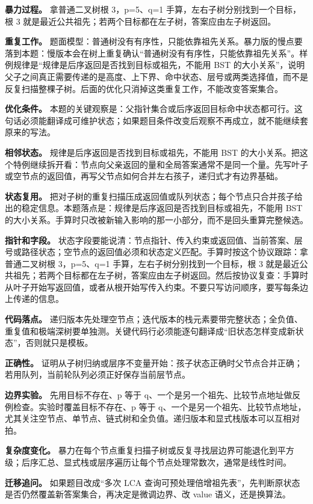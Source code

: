\textbf{暴力过程。} 拿普通二叉树根 3，p=5、q=1 手算，左右子树分别找到一个目标，根 3 就是最近公共祖先；若两个目标都在左子树，答案应由左子树返回。

\textbf{重复工作。} 题面模型：普通树没有有序性，只能依靠祖先关系。暴力版的慢点要落到本题：慢版本会在树上重复确认“普通树没有有序性，只能依靠祖先关系”。样例规律是“规律是后序返回是否找到目标或祖先，不能用 BST 的大小关系”，说明父子之间真正需要传递的是高度、上下界、命中状态、层号或两类选择值，而不是反复扫描整棵子树。后面的优化只消掉这类重复工作，不能改变答案集合。

\textbf{优化条件。} 本题的关键观察是：父指针集合或后序返回目标命中状态都可行。这句话必须能翻译成可维护状态；如果题目条件改变后观察不再成立，就不能继续套原来的写法。

\textbf{相邻状态。} 规律是后序返回是否找到目标或祖先，不能用 BST 的大小关系。把这个特例继续拆开看：节点向父亲返回的量和全局答案通常不是同一个量。先写叶子或空节点的返回值，再写父节点如何合并左右孩子，递归式才有边界基础。

\textbf{状态复用。} 把对子树的重复扫描压成返回值或队列状态；每个节点只合并孩子给出的稳定信息。本题落点是：规律是后序返回是否找到目标或祖先，不能用 BST 的大小关系。手算时只改被新输入影响的那一小部分，而不是回头重算完整候选。

\textbf{指针和字段。} 状态字段要能说清：节点指针、传入约束或返回值、当前答案、层号或路径状态；空节点的返回值必须和状态定义匹配。手算时按这个协议跟踪：拿普通二叉树根 3，p=5、q=1 手算，左右子树分别找到一个目标，根 3 就是最近公共祖先；若两个目标都在左子树，答案应由左子树返回。然后按协议复查：手算时从叶子开始写返回值，或者从根开始写传入约束。不要只写访问顺序，要写每条边上传递的信息。

\textbf{代码落点。} 递归版本先处理空节点；迭代版本的栈元素要带完整状态；全负值、重复值和极端深树要单独测。关键代码行必须能逐句翻译成“旧状态怎样变成新状态”，否则就只是模板。

\textbf{正确性。} 证明从子树归纳或层序不变量开始：孩子状态正确时父节点合并正确；若用队列，当前轮队列必须正好保存当前层节点。

\textbf{边界实验。} 先用目标不存在、p 等于 q、一个是另一个祖先、比较节点地址做反例检查。实验时覆盖目标不存在、p 等于 q、一个是另一个祖先、比较节点地址，尤其关注空节点、单节点、链式树和全负值。递归版本和显式栈版本可以互相对拍。

\textbf{复杂度变化。} 暴力在每个节点重复扫描子树或反复寻找层边界可能退化到平方级；后序汇总、显式栈或层序遍历让每个节点处理常数次，通常是线性时间。

\textbf{迁移追问。} 如果题目改成“多次 LCA 查询可预处理倍增祖先表”，先判断原状态是否仍然覆盖新答案集合，再决定是微调边界、改 value 语义，还是换算法。

